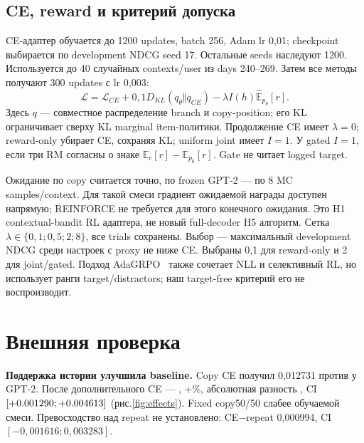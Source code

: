 \documentclass[10pt,a4paper,twocolumn]{article}
\begin{document}
\subsection{CE, reward и критерий допуска}
CE-адаптер обучается до 1200 updates, batch 256, Adam lr 0,01; checkpoint
выбирается по development NDCG seed 17. Остальные seeds наследуют 1200.
Используется до 40 случайных contexts/user из days 240--269.
Затем все методы получают 300 updates с lr 0,003:
\begin{equation}
\mathcal L=\mathcal L_{CE}+0{,}1D_{KL}(q_\theta\Vert q_{CE})
-\lambda I(h)\widehat{\mathbb E}_{p_\theta}[r].
\end{equation}
Здесь $q$ --- совместное распределение branch и copy-position; его KL
ограничивает сверху KL marginal item-политики. Продолжение CE имеет
$\lambda=0$; reward-only убирает CE, сохраняя KL; uniform joint имеет $I=1$.
У gated $I=1$, если три RM согласны о знаке
$\mathbb E_c[r]-\mathbb E_{p_0}[r]$. Gate не читает logged target.

Ожидание по copy считается точно, по frozen GPT-2 --- по 8 MC samples/context.
Для такой смеси градиент ожидаемой награды доступен напрямую; REINFORCE
не требуется для этого конечного ожидания. Это H1 contextual-bandit RL
адаптера, не новый full-decoder H5 алгоритм. Сетка $\lambda\in\{0{,}1;0{,}5;2;8\}$,
все trials сохранены. Выбор --- максимальный development NDCG среди
настроек с proxy не ниже CE. Выбраны 0,1 для reward-only и 2 для joint/gated.
Подход AdaGRPO~\cite{ada} также сочетает NLL и селективный RL, но использует
ранги target/distractors; наш target-free критерий его не воспроизводит.



\section{Внешняя проверка}

\begin{table}[h]
\centering\small\setlength{\tabcolsep}{3pt}
\caption{Один test, общий каталог. Proxy --- прогноз completion top1,
не наблюдённая награда новой рекомендации.}

\label{tab:ranking}
\end{table}

\textbf{Поддержка истории улучшила baseline.} Copy CE получил 0,012731
против \SftNdcg{} у GPT-2. После дополнительного CE --- \CeNdcg{},
+\GainPercent\%, абсолютная разность \CopyDelta{},
CI $[+0.001290;+0.004613]$ (рис.\ref{fig:effects}). Fixed copy50/50 слабее
обучаемой смеси. Превосходство над repeat не установлено: CE$-$repeat
0,000994, CI $[-0,001616;0,003283]$.
\end{document}
